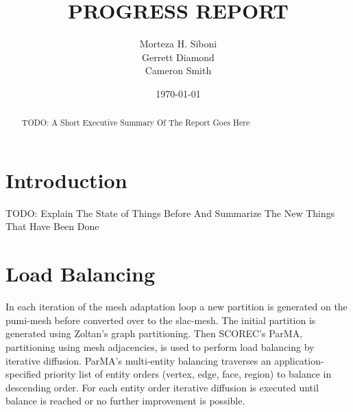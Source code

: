 \documentclass[review,authoryear,12pt]{elsarticle_summary_report}
\begin{document}
\title{PROGRESS REPORT}%

\author[]{Morteza H. Siboni \\
Gerrett Diamond \\
Cameron Smith}



\date{\today}



\begin{abstract}
  TODO: A Short Executive Summary Of The Report Goes Here
\end{abstract}


\maketitle




\section{Introduction}
TODO: Explain The State of Things Before And Summarize The New Things That Have Been Done

\section{Load Balancing}
In each iteration of the mesh adaptation loop a new partition is generated on the
pumi-mesh before converted over to the slac-mesh. The initial partition is generated
using Zoltan's graph partitioning. Then SCOREC's ParMA, partitioning using mesh adjacencies,
is used to perform load balancing by iterative diffusion. ParMA's multi-entity balancing
traverses an application-specified priority list of entity orders (vertex, edge, face,
region) to balance in descending order.
For each entity order iterative diffusion is executed until balance is reached
or no further improvement is possible.
\end{document}
